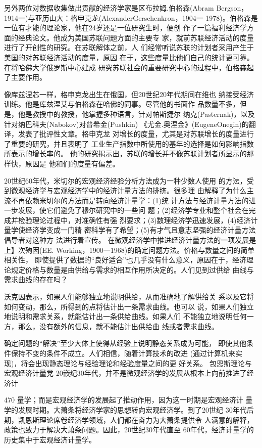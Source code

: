 另外两位对数据收集做出贡献的经济学家是区布拉姆.伯格森(Abram
Bergson，1914一)与亚历山大：格申克龙(AlexanderGerschenkron，1904一
1978)。伯格森是一位有才能的理论家，他在24岁还是一位研究生时，便创
作了一篇福利经济学方面的经典论文。他成为美国苏联问题方面的主要专
家，就前苏联经济活动的度量进行了开创性的研究。在苏联解体之前，人
们经常听说苏联的计划者采用产生于美国的对苏联经济活动的度量，原因
在于，这些度量比他们自己的统计更可靠。在将哈佛大学俄罗斯中心建成
研究苏联社会的重要研究中心的过程中，伯格森起了主要作用。

像库兹涅芯一样，格申克龙出生在俄国，但20世纪20年代期间在维也
纳接受经济训练。他是库兹涅艾与伯格森在哈佛的同事。尽管他的书面作
品数量不多，但是，他是教授中的教授，他掌握多种语言，针对帕斯捷尔
纳克(Pasternak)，以及针对纳巴科夫(Nabokov)对普希金(Pushkin)
《尤金.奥涅金》(EugeneOnegin)的翻译，发表了批评性文章。格申克龙
对增长的度量，尤其是对苏联增长的度量进行了重要的研究，并且表明了
工业生产指数中所使用的基年的选择是如何影响指数所表示的增长率的。
他的研究揭示出，苏联的增长并不像苏联计划者所显示的那样快，原因是
他和们的度量有偏差。

20世纪60年代，米切尔的宏观经济经验分析方法成为一种少数人使用
的方法，受到微观经济学与宏观经济学中的经济计量方法的排挤。很多理
由解释了为什么主流不再依赖米切尔的方法而是转向经济计量学：(1)统
计方法与经济计量方法的进一步发展，使它们避免了穆尔研究中的一些问
题；(2)经济学专业和整个社会在完成并检验理论过程中，对准确性有强
烈要求；(3)数理经济学迅速发展，(4)经济计量学使经济学变成一门精
密科学有了希望；(5)有才气且意志坚强的经济计量方法倡导者对这种方
法进行着宣传。
在微观经济学中推进经济计量方法的一项发展是上】次殉因(EE.
Working，1900一1968)的确定问题方法。价格与数量之间的简单相关性，
即使提供了数据的“良好适合”也几乎没有什么意义，原因在于，经济理
论规定价格与数量是由供给与需求的相互作用所决定的。人们见到过供给
曲线与需求曲线的存在吗？

沃克因表示，如果人们能够独立地说明供给，从而准确地了解供给关
系以及它将如何变动，那么，所得到的点将估计出一条需求曲线。也可以
说，如果人们独立地说明和需求关系，就能估计出一条供给曲线。如果人们
不能独立地说明任何一方，那么，没有额外的信息，就不能估计出供给曲
线或者需求曲线。

确定问题的“解决”至少大体上使得从经验上说明静态关系成为可能，
即使其他条件保持不变的条件不成立。人们相信，随着计算技术的改进
(通过计算机来实现)，将会出现静态理论与经验理论和经验度量之间的更
好关系。
包恩斯理论与宏观经济计量党
20嵌纪30年代，并不是微观经济学的发展从根本上向前推进了经济计


470
量学；而是宏观经济学的发展起了推动作用，因为这一时期是宏观经济计
量学的发展时期。大萧条将经济学家的思想转向宏观经济学。到了20世纪
30年代后期，凯恩斯理论席卷经济学领域，人们都在奋力为大萧条提供令
人满意的解释，政策也致力于解决大萧条问题。因此，20世纪30年代直至
60年代，经济计量学的历史集中于宏观经济计量学。

